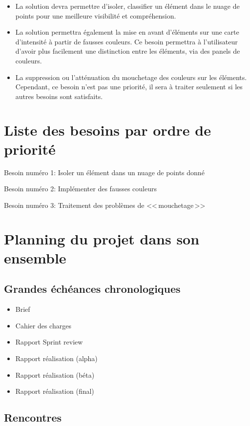 \documentclass[12pt,titlepage,french]{article}
\begin{document}
\begin{itemize}
  \item La solution devra permettre d'isoler, classifier un élément dans le nuage de points pour une meilleure visibilité et compréhension.
  \item La solution permettra également la mise en avant d'éléments sur une carte d'intensité à partir de fausses couleurs. Ce besoin permettra à l'utilisateur d'avoir plus facilement une distinction entre les éléments, via des panels de couleurs.
  \item La suppression ou l'atténuation du mouchetage des couleurs sur les éléments. Cependant, ce besoin n'est pas une priorité, il sera à traiter seulement si les autres besoins sont satisfaits.
\end{itemize}

\section{Liste des besoins par ordre de priorité}

Besoin numéro 1: Isoler un élément dans un nuage de points donné

Besoin numéro 2: Implémenter des fausses couleurs

Besoin numéro 3: Traitement des problèmes de <<\,mouchetage\,>> 


\section{Planning du projet dans son ensemble}

\subsection*{Grandes échéances chronologiques}

\begin{itemize}
  \item Brief
  \item Cahier des charges
  \item Rapport Sprint review
  \item Rapport réalisation (alpha)
  \item Rapport réalisation (béta)
  \item Rapport réalisation (final)
\end{itemize}

\subsection*{Rencontres}
\end{document}
